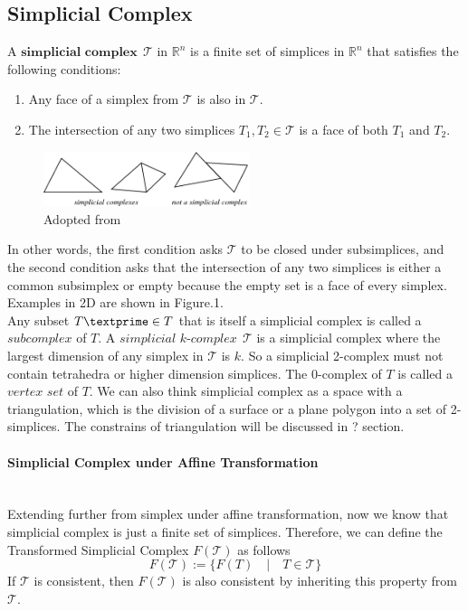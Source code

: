 \subsection{Simplicial Complex}
    \begin{definition*}
    A $\textbf{simplicial complex} ~~\mathcal T$ in $\mathbb{R}^n$ is a finite set of simplices in $\mathbb{R}^n$ that satisfies the following conditions:
    \begin{enumerate}[label =\arabic*.]
      \item Any face of a simplex from $\mathcal{T}$ is also in $\mathcal{T}$.
      \item The intersection of any two simplices ${T}_1, {T}_2 \in \mathcal{T}$ is a face of both ${T}_1$ and  ${T}_2$.
    \end{enumerate}
    \begin{figure}[b]
    \centering
    \includegraphics[width=60mm]{SimplicialComplex}
    \caption[Simplicial Complex Example and Counterexample]{Adopted from~\cite{WEBSITE:1}}%
    \label{Fig2}
    \end{figure}
    \end{definition*}
    In other words, the first condition asks $\mathcal{T}$ to be closed under subsimplices, and the second condition asks that the intersection of any two simplices is either a common subsimplex or empty because the empty set is a face of every simplex. Examples in 2D are shown in Figure.1. \\
    \indent
    Any subset ${T\textprime}\in{T}$ that is itself a simplicial complex is called a $\textit{subcomplex}$ of ${T}$. A $\textit{simplicial k-complex} ~~\mathcal T$ is a simplicial complex where the largest dimension of any simplex in $\mathcal T$ is ${k}$. So a simplicial 2-complex must not contain tetrahedra or higher dimension simplices. The 0-complex of ${T}$ is called a $\textit{vertex set}$ of ${T}$. We can also think simplicial complex as a space with a triangulation, which is the division of a surface or a plane polygon into a set of 2-simplices. The constrains of triangulation will be discussed in ? section.\\

    \paragraph{Simplicial Complex under Affine Transformation}\mbox{}\\
    Extending further from simplex under affine transformation, now we know that simplicial complex is just a finite set of simplices. Therefore, we can define the Transformed Simplicial Complex $F(\mathcal{T})$ as follows
    \begin{equation*}
    F(\mathcal{T}) := \{F(T) \quad \vert \quad T\in \mathcal{T}\}
    \end{equation*}
    If $\mathcal{T}$ is consistent, then $F(\mathcal{T})$ is also consistent by inheriting this property from $\mathcal{T}$.

